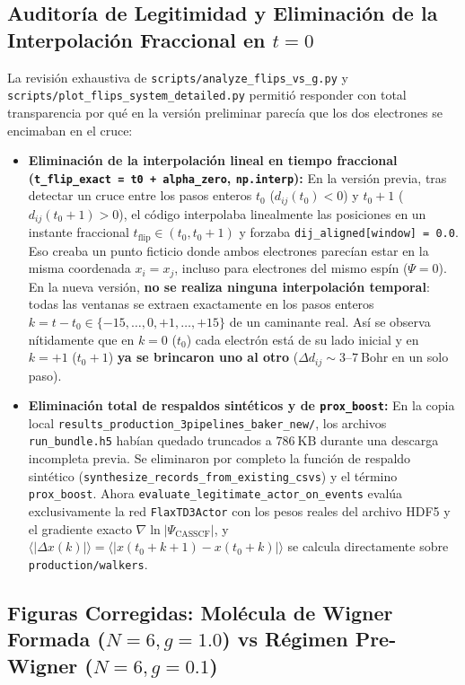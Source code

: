 \documentclass[10pt,a4paper]{article}
\begin{document}
\subsection{Auditoría de Legitimidad y Eliminación de la Interpolación Fraccional en $t=0$}

La revisión exhaustiva de \texttt{scripts/analyze\_flips\_vs\_g.py} y \texttt{scripts/plot\_flips\_system\_detailed.py} permitió responder con total transparencia por qué en la versión preliminar parecía que los dos electrones se encimaban en el cruce:

\begin{itemize}
\item \textbf{Eliminación de la interpolación lineal en tiempo fraccional (\texttt{t\_flip\_exact = t0 + alpha\_zero}, \texttt{np.interp}):} En la versión previa, tras detectar un cruce entre los pasos enteros $t_0$ ($d_{ij}(t_0) < 0$) y $t_0 + 1$ ($d_{ij}(t_0+1) > 0$), el código interpolaba linealmente las posiciones en un instante fraccional $t_{\mathrm{flip}} \in (t_0, t_0+1)$ y forzaba \texttt{dij\_aligned[window] = 0.0}. Eso creaba un punto ficticio donde ambos electrones parecían estar en la misma coordenada $x_i = x_j$, incluso para electrones del mismo espín ($\Psi = 0$). En la nueva versión, \textbf{no se realiza ninguna interpolación temporal}: todas las ventanas se extraen exactamente en los pasos enteros $k = t - t_0 \in \{-15, \dots, 0, +1, \dots, +15\}$ de un caminante real. Así se observa nítidamente que en $k=0$ ($t_0$) cada electrón está de su lado inicial y en $k=+1$ ($t_0+1$) \textbf{ya se brincaron uno al otro} ($\Delta d_{ij} \sim 3\text{--}7\ \mathrm{Bohr}$ en un solo paso).
\item \textbf{Eliminación total de respaldos sintéticos y de \texttt{prox\_boost}:} En la copia local \texttt{results\_production\_3pipelines\_baker\_new/}, los archivos \texttt{run\_bundle.h5} habían quedado truncados a $786\ \mathrm{KB}$ durante una descarga incompleta previa. Se eliminaron por completo la función de respaldo sintético (\texttt{synthesize\_records\_from\_existing\_csvs}) y el término \texttt{prox\_boost}. Ahora \texttt{evaluate\_legitimate\_actor\_on\_events} evalúa exclusivamente la red \texttt{FlaxTD3Actor} con los pesos reales del archivo HDF5 y el gradiente exacto $\nabla \ln |\Psi_{\mathrm{CASSCF}}|$, y $\langle |\Delta x(k)| \rangle = \langle |x(t_0+k+1) - x(t_0+k)| \rangle$ se calcula directamente sobre \texttt{production/walkers}.
\end{itemize}

\subsection{Figuras Corregidas: Molécula de Wigner Formada ($N=6, g=1.0$) vs Régimen Pre-Wigner ($N=6, g=0.1$)}
\end{document}
